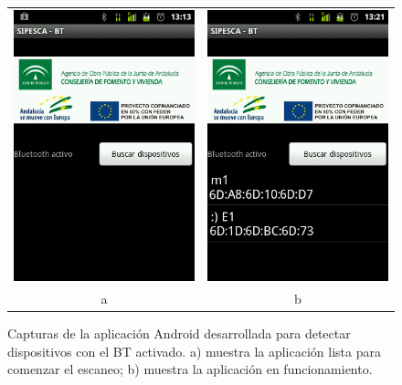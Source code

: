 \documentclass[twocolumn,twoside]{Jornadas}
\begin{document}
\begin{figure}[htpb] 
\begin{center} 
\begin{tabular}{cc}

\includegraphics[scale=0.30]{CAP1.png}  &
\includegraphics[scale=0.30]{CAP2.png}  \\

a & b 
 
\end{tabular}
\end{center} 
\caption{Capturas de la aplicación Android desarrollada para detectar dispositivos con el BT activado. a) muestra la aplicación lista para comenzar el escaneo; b) muestra la aplicación en funcionamiento.} 
\label{apk} 
\end{figure}
\end{document}
